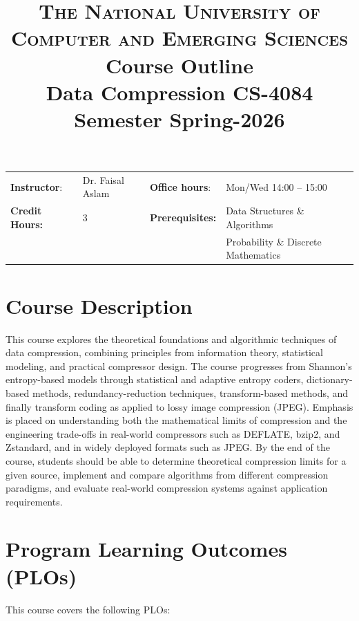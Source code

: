 \documentclass{article}
\title{
{\Large\scshape The National University of Computer and Emerging Sciences}\\[10pt]
{\large Course Outline}\\[4pt]
{\Huge\textbf{Data Compression CS-4084}}\\[8pt]
{\normalsize Semester Spring-2026}
}
\author{ }
\date{}
\begin{document}
\maketitle
\vspace{-0.5cm}

\begin{table}[H]
    \centering
    \def\arraystretch{1.5}
    \begin{tabularx}{\textwidth}{ l X l X }
        \textbf{Instructor}: & Dr. Faisal Aslam & \textbf{Office hours}: & Mon/Wed 14:00 -- 15:00 \\
        \textbf{Credit Hours:} & 3 & \textbf{Prerequisites:} & Data Structures \& Algorithms\\
        & & & Probability \& Discrete Mathematics \\
    \end{tabularx}
    \label{tab:Intro}
\end{table}
\vspace{-1cm}

\section*{Course Description}
This course explores the theoretical foundations and algorithmic techniques of data compression, combining principles from information theory, statistical modeling, and practical compressor design. The course progresses from Shannon's entropy-based models through statistical and adaptive entropy coders, dictionary-based methods, redundancy-reduction techniques, transform-based methods, and finally transform coding as applied to lossy image compression (JPEG). Emphasis is placed on understanding both the mathematical limits of compression and the engineering trade-offs in real-world compressors such as DEFLATE, bzip2, and Zstandard, and in widely deployed formats such as JPEG. By the end of the course, students should be able to determine theoretical compression limits for a given source, implement and compare algorithms from different compression paradigms, and evaluate real-world compression systems against application requirements.

\section*{Program Learning Outcomes (PLOs)}
This course covers the following PLOs:
\end{document}
